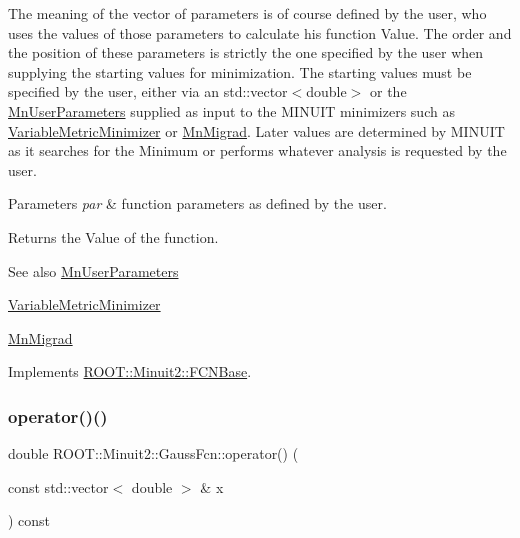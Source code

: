 The meaning of the vector of parameters is of course defined by the user, who uses the values of those parameters to calculate his function Value. The order and the position of these parameters is strictly the one specified by the user when supplying the starting values for minimization. The starting values must be specified by the user, either via an std\+::vector$<$double$>$ or the \mbox{\hyperlink{classROOT_1_1Minuit2_1_1MnUserParameters}{Mn\+User\+Parameters}} supplied as input to the M\+I\+N\+U\+IT minimizers such as \mbox{\hyperlink{classROOT_1_1Minuit2_1_1VariableMetricMinimizer}{Variable\+Metric\+Minimizer}} or \mbox{\hyperlink{classROOT_1_1Minuit2_1_1MnMigrad}{Mn\+Migrad}}. Later values are determined by M\+I\+N\+U\+IT as it searches for the Minimum or performs whatever analysis is requested by the user.


\begin{DoxyParams}{Parameters}
{\em par} & function parameters as defined by the user.\\
\hline
\end{DoxyParams}
\begin{DoxyReturn}{Returns}
the Value of the function.
\end{DoxyReturn}
\begin{DoxySeeAlso}{See also}
\mbox{\hyperlink{classROOT_1_1Minuit2_1_1MnUserParameters}{Mn\+User\+Parameters}} 

\mbox{\hyperlink{classROOT_1_1Minuit2_1_1VariableMetricMinimizer}{Variable\+Metric\+Minimizer}} 

\mbox{\hyperlink{classROOT_1_1Minuit2_1_1MnMigrad}{Mn\+Migrad}} 
\end{DoxySeeAlso}


Implements \mbox{\hyperlink{classROOT_1_1Minuit2_1_1FCNBase_ae4a86bd94d0d0f5ca6fc8f8ab2bb43cd}{R\+O\+O\+T\+::\+Minuit2\+::\+F\+C\+N\+Base}}.

\mbox{\label{classROOT_1_1Minuit2_1_1GaussFcn_a00140c21f302cdf076d306ac76299d1a}} 
\subsubsection{\texorpdfstring{operator()()}{operator()()}\hspace{0.1cm}{\footnotesize\ttfamily [2/2]}}
{\footnotesize\ttfamily double R\+O\+O\+T\+::\+Minuit2\+::\+Gauss\+Fcn\+::operator() (\begin{DoxyParamCaption}\item[{const std\+::vector$<$ double $>$ \&}]{x }\end{DoxyParamCaption}) const\hspace{0.3cm}{\ttfamily [virtual]}}

